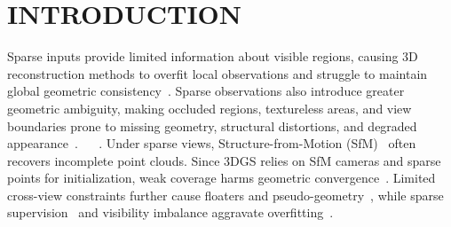 \section{INTRODUCTION}
\label{sec:intro}

Sparse inputs provide limited information about visible regions, causing 3D reconstruction methods to overfit local observations and struggle to maintain global geometric consistency~\cite{Yang23_FreeNeRF}. Sparse observations also introduce greater geometric ambiguity, making occluded regions, textureless areas, and view boundaries prone to missing geometry, structural distortions, and degraded appearance~\cite{Niemeyer22_RegNeRF}. ~\cite{Kerbl23_3DGS} ~\cite{Lu24_ScaffoldGS}. Under sparse views, Structure-from-Motion (SfM)~\cite{Schonberger16_COLMAP} often recovers incomplete point clouds. Since 3DGS relies on SfM cameras and sparse points for initialization, weak coverage harms geometric convergence~\cite{Chung24_DepthRegGS}. Limited cross-view constraints further cause floaters and pseudo-geometry~\cite{Xu25_DropoutGS}, while sparse supervision~\cite{Park25_DropGaussian} and visibility imbalance aggravate overfitting~\cite{Somraj23_ViPNeRF}.

